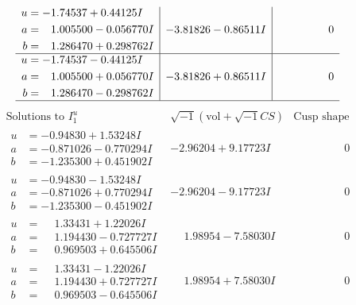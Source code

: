 \documentclass[1p]{elsarticle_modified}
\theoremstyle{definition}
\newcommand{\I}{\sqrt{-1}}
\begin{document}
$$\begin{array}{c|c|c}
\begin{aligned}
u &= -1.74537 + 0.44125 I \\
a &= \phantom{-}1.005500 - 0.056770 I \\
b &= \phantom{-}1.286470 + 0.298762 I\end{aligned}
 & -3.81826 - 0.86511 I & \phantom{-0.000000 } 0 \\ \hline\begin{aligned}
u &= -1.74537 - 0.44125 I \\
a &= \phantom{-}1.005500 + 0.056770 I \\
b &= \phantom{-}1.286470 - 0.298762 I\end{aligned}
 & -3.81826 + 0.86511 I & \phantom{-0.000000 } 0\\
 \hline 
 \end{array}$$\newpage$$\begin{array}{c|c|c}  
\text{Solutions to }I^u_{1}& \I (\text{vol} + \sqrt{-1}CS) & \text{Cusp shape}\\
 \hline 
\begin{aligned}
u &= -0.94830 + 1.53248 I \\
a &= -0.871026 - 0.770294 I \\
b &= -1.235300 + 0.451902 I\end{aligned}
 & -2.96204 + 9.17723 I & \phantom{-0.000000 } 0 \\ \hline\begin{aligned}
u &= -0.94830 - 1.53248 I \\
a &= -0.871026 + 0.770294 I \\
b &= -1.235300 - 0.451902 I\end{aligned}
 & -2.96204 - 9.17723 I & \phantom{-0.000000 } 0 \\ \hline\begin{aligned}
u &= \phantom{-}1.33431 + 1.22026 I \\
a &= \phantom{-}1.194430 - 0.727727 I \\
b &= \phantom{-}0.969503 + 0.645506 I\end{aligned}
 & \phantom{-}1.98954 - 7.58030 I & \phantom{-0.000000 } 0 \\ \hline\begin{aligned}
u &= \phantom{-}1.33431 - 1.22026 I \\
a &= \phantom{-}1.194430 + 0.727727 I \\
b &= \phantom{-}0.969503 - 0.645506 I\end{aligned}
 & \phantom{-}1.98954 + 7.58030 I & \phantom{-0.000000 } 0 \\ \hline\begin{aligned}

\end{aligned}
\end{array}$$
\end{document}
